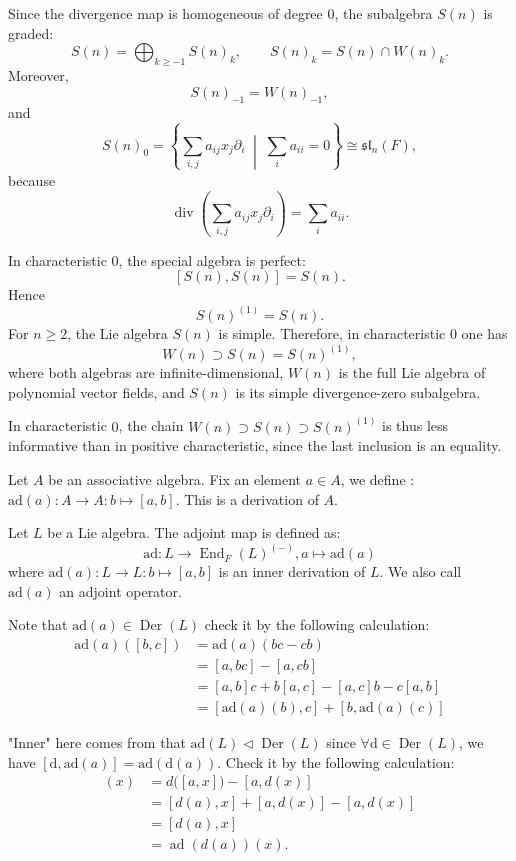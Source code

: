 Since the divergence map is homogeneous of degree $0$, the subalgebra $S(n)$ is
graded:
\[
    S(n)=\bigoplus_{k\ge -1} S(n)_k,
    \qquad
    S(n)_k=S(n)\cap W(n)_k.
\]
Moreover,
\[
    S(n)_{-1}=W(n)_{-1},
\]
and
\[
    S(n)_0
    =
    \left\{
    \sum_{i,j} a_{ij}x_j\partial_i
    \;\middle|\;
    \sum_i a_{ii}=0
    \right\}
    \cong \mathfrak{sl}_n(F),
\]
because
\[
    \operatorname{div}\!\left(\sum_{i,j} a_{ij}x_j\partial_i\right)
    =
    \sum_i a_{ii}.
\]

In characteristic $0$, the special algebra is perfect:
\[
    [S(n),S(n)]=S(n).
\]
Hence
\[
    S(n)^{(1)}=S(n).
\]
For $n\ge 2$, the Lie algebra $S(n)$ is simple. Therefore, in characteristic
$0$ one has
\[
    W(n)\supset S(n)=S(n)^{(1)},
\]
where both algebras are infinite-dimensional, $W(n)$ is the full Lie algebra of
polynomial vector fields, and $S(n)$ is its simple divergence-zero subalgebra.

\begin{remark}
    In characteristic $0$, the chain $W(n)\supset S(n)\supset S(n)^{(1)}$ is thus
    less informative than in positive characteristic, since the last inclusion is an
    equality.
\end{remark}

Let $A$ be an associative algebra. Fix an element $a \in A$, we define : $\mathrm{ad}(a): A \to A : b\mapsto [a,b]$. This is a derivation of $A$.

\begin{definition}
    Let $L$ be a Lie algebra. The adjoint map is defined as:
    \[
        \mathrm{ad}: L \to \operatorname{End}_F(L)^{(-)}, a \mapsto \mathrm{ad}(a)
    \]
    where $\mathrm{ad}(a): L \to L : b\mapsto [a,b]$ is an inner derivation of $L$. We also call $\mathrm{ad}(a)$ an adjoint operator.
\end{definition}

Note that $\mathrm{ad}(a) \in \operatorname{Der}(L)$ check it by the following calculation:
\begin{align*}
    \mathrm{ad}(a)([b,c]) & =\mathrm{ad}(a)(bc-cb)                       \\
                          & =[a,bc]-[a,cb]                               \\
                          & =[a,b]c+b[a,c]-[a,c]b-c[a,b]                 \\
                          & =[\mathrm{ad}(a)(b),c]+[b,\mathrm{ad}(a)(c)]
\end{align*}

"Inner" here comes from that $\mathrm{ad}(L) \triangleleft \operatorname{Der}(L)$ since $\forall \mathrm{d} \in \operatorname{Der}(L)$, we have $[\mathrm{d},\mathrm{ad}(a)]=  \mathrm{ad}(\mathrm{d}(a))$. Check it by the following calculation:
\begin{align*}
    [d,\operatorname{ad}(a)](x)
     & = d\bigl([a,x]\bigr)-[a,d(x)] \\
     & = [d(a),x]+[a,d(x)]-[a,d(x)]  \\
     & = [d(a),x]                    \\
     & = \operatorname{ad}(d(a))(x).
\end{align*}

